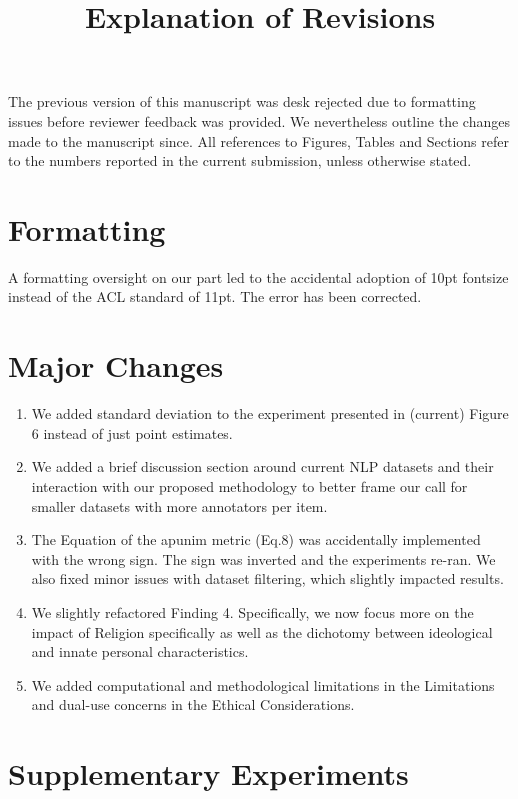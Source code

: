 \documentclass[11pt,a4paper]{article}
\date{}
\title{Explanation of Revisions}
\begin{document}
	\maketitle
	
	The previous version of this manuscript was desk rejected due to formatting issues before reviewer feedback was provided. We nevertheless outline the changes made to the manuscript since. All references to Figures, Tables and Sections refer to the numbers reported in the current submission, unless otherwise stated.
	
	\section*{Formatting}
	
	A formatting oversight on our part led to the accidental adoption of 10pt fontsize instead of the ACL standard of 11pt. The error has been corrected.
	
	
	\section*{Major Changes}
	
	\begin{enumerate}
		\item We added standard deviation to the experiment presented in (current) Figure 6 instead of just point estimates.
		\item We added a brief discussion section around current NLP datasets and their interaction with our proposed methodology to better frame our call for smaller datasets with more annotators per item.
		\item The Equation of the apunim metric (Eq.8) was accidentally implemented with the wrong sign. The sign was inverted and the experiments re-ran. We also fixed minor issues with dataset filtering, which slightly impacted results.
		\item We slightly refactored Finding 4. Specifically, we now focus more on the impact of Religion specifically as well as the dichotomy between ideological and innate personal characteristics.
		\item We added computational and methodological limitations in the Limitations and dual-use concerns in the Ethical Considerations.
	\end{enumerate}
	
	
	\section*{Supplementary Experiments}
	
\end{document}
